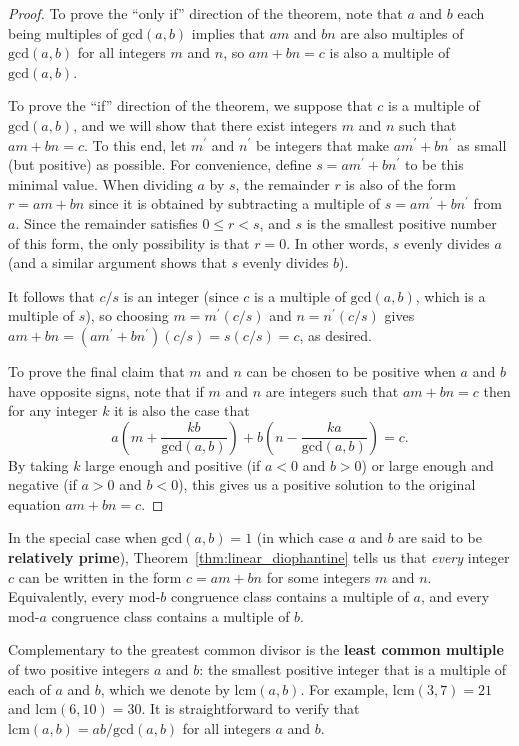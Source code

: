 \begin{proof}
	To prove the ``only if'' direction of the theorem, note that $a$ and $b$ each being multiples of $\mathrm{gcd}(a,b)$ implies that $am$ and $bn$ are also multiples of $\mathrm{gcd}(a,b)$ for all integers $m$ and $n$, so $am + bn = c$ is also a multiple of $\mathrm{gcd}(a,b)$.
	
	To prove the ``if'' direction of the theorem, we suppose that $c$ is a multiple of $\mathrm{gcd}(a,b)$, and we will show that there exist integers $m$ and $n$ such that $am + bn = c$. To this end, let $m^\prime$ and $n^\prime$ be integers that make $am^\prime + bn^\prime$ as small (but positive) as possible. For convenience, define $s = am^\prime + bn^\prime$ to be this minimal value. When dividing $a$ by $s$, the remainder $r$ is also of the form $r = am + bn$ since it is obtained by subtracting a multiple of $s = am^\prime + bn^\prime$ from $a$. Since the remainder satisfies $0 \leq r < s$, and $s$ is the smallest positive number of this form, the only possibility is that $r = 0$. In other words, $s$ evenly divides $a$ (and a similar argument shows that $s$ evenly divides $b$).
	
	It follows that $c/s$ is an integer (since $c$ is a multiple of $\mathrm{gcd}(a,b)$, which is a multiple of $s$), so choosing $m = m^\prime(c/s)$ and $n = n^\prime(c/s)$ gives $am + bn = (am^\prime + bn^\prime)(c/s) = s(c/s) = c$, as desired.
	
	To prove the final claim that $m$ and $n$ can be chosen to be positive when $a$ and $b$ have opposite signs, note that if $m$ and $n$ are integers such that $am + bn = c$ then for any integer $k$ it is also the case that
	\[
		a\left(m + \frac{kb}{\mathrm{gcd}(a,b)}\right) + b\left(n - \frac{ka}{\mathrm{gcd}(a,b)}\right) = c.
	\]
	By taking $k$ large enough and positive (if $a < 0$ and $b > 0$) or large enough and negative (if $a > 0$ and $b < 0$), this gives us a positive solution to the original equation $am + bn = c$.
\end{proof}

In the special case when $\mathrm{gcd}(a,b) = 1$ (in which case $a$ and $b$ are said to be \textbf{relatively prime}), Theorem~\ref{thm:linear_diophantine} tells us that \emph{every} integer $c$ can be written in the form $c = am + bn$ for some integers $m$ and $n$. Equivalently, every mod-$b$ congruence class contains a multiple of $a$, and every mod-$a$ congruence class contains a multiple of $b$.

Complementary to the greatest common divisor is the \textbf{least common multiple} of two positive integers $a$ and $b$: the smallest positive integer that is a multiple of each of $a$ and $b$, which we denote by $\mathrm{lcm}(a,b)$. For example, $\mathrm{lcm}(3,7) = 21$ and $\mathrm{lcm}(6,10) = 30$. It is straightforward to verify that $\mathrm{lcm}(a,b) = ab/\mathrm{gcd}(a,b)$ for all integers $a$ and $b$.


